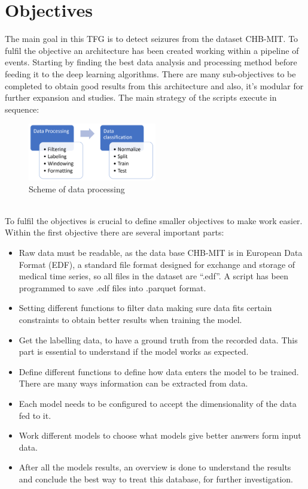 \section{Objectives}
\label{sec-objectives}
The main goal in this TFG is to detect seizures from the dataset CHB-MIT. To fulfil the objective an architecture has been created working within a pipeline of events. Starting by finding the best data analysis and processing method before feeding it to the deep learning algorithms. There are many sub-objectives to be completed to obtain good results from this architecture and also, it’s modular for further expansion and studies. The main strategy of the scripts execute in sequence:
\\
\begin{figure}[h!]
    \caption{Scheme of data processing }
    \centering
    \includegraphics[width=0.5\textwidth]{img/pipeline.png}
\end{figure}
\\
To fulfil the objectives is crucial to define smaller objectives to make work easier. Within the first objective there are several important parts: 
\\
\begin{itemize}

    \item Raw data must be readable, as the data base CHB-MIT\cite{goldberger2000physiobank} is in European Data Format (EDF), a standard file format designed for exchange and storage of medical time series, so all files in the dataset are “.edf”. A script has been programmed to save .edf files into .parquet format.
    \item Setting different functions to filter data making sure data fits certain constraints to obtain better results when training the model.
    \item Get the labelling data, to have a ground truth from the recorded data. This part is essential to understand if the model works as expected.
    \item Define different functions to define how data enters the model to be trained. There are many ways information can be extracted from data. 
    \item Each model needs to be configured to accept the dimensionality of the data fed to it.
    \item Work different models to choose what models give better answers form input data.
    \item After all the models results, an overview is done to understand the results and conclude the best way to treat this database, for further investigation.

\end{itemize}